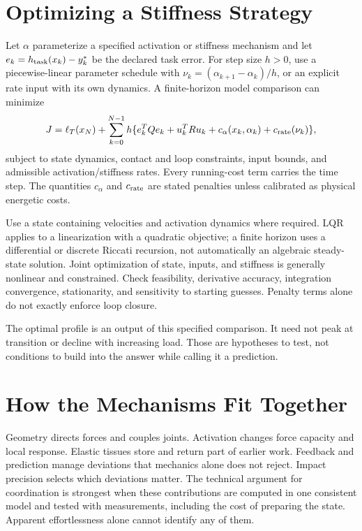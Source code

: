 \section{Optimizing a Stiffness Strategy}
\label{sec:optimization}

Let $\alpha$ parameterize a specified activation or stiffness mechanism and
let $e_k=h_{\rm task}(x_k)-y_k^*$ be the declared task error. For step size
$h>0$, use a piecewise-linear parameter schedule with
$\nu_k=(\alpha_{k+1}-\alpha_k)/h$, or an explicit rate input with its own
dynamics. A finite-horizon model comparison can minimize
\begin{equation}
J=\ell_T(x_N)+\sum_{k=0}^{N-1}h\{e_k^TQe_k+u_k^TRu_k+
c_\alpha(x_k,\alpha_k)+c_{\rm rate}(\nu_k)\},
\end{equation}
subject to state dynamics, contact and loop constraints, input bounds, and
admissible activation/stiffness rates. Every running-cost term carries the
time step. The quantities $c_\alpha$ and $c_{\rm rate}$ are stated penalties
unless calibrated as physical energetic costs.

Use a state containing velocities and activation dynamics where required.
LQR applies to a linearization with a quadratic objective; a finite horizon
uses a differential or discrete Riccati recursion, not automatically an
algebraic steady-state solution. Joint optimization of state, inputs, and
stiffness is generally nonlinear and constrained. Check feasibility, derivative
accuracy, integration convergence, stationarity, and sensitivity to starting
guesses. Penalty terms alone do not exactly enforce loop closure.

The optimal profile is an output of this specified comparison. It need not
peak at transition or decline with increasing load. Those are hypotheses to
test, not conditions to build into the answer while calling it a prediction.

\section{How the Mechanisms Fit Together}

Geometry directs forces and couples joints. Activation changes force capacity
and local response. Elastic tissues store and return part of earlier work.
Feedback and prediction manage deviations that mechanics alone does not reject.
Impact precision selects which deviations matter. The technical argument for
coordination is strongest when these contributions are computed in one
consistent model and tested with measurements, including the cost of preparing
the state. Apparent effortlessness alone cannot identify any of them.

